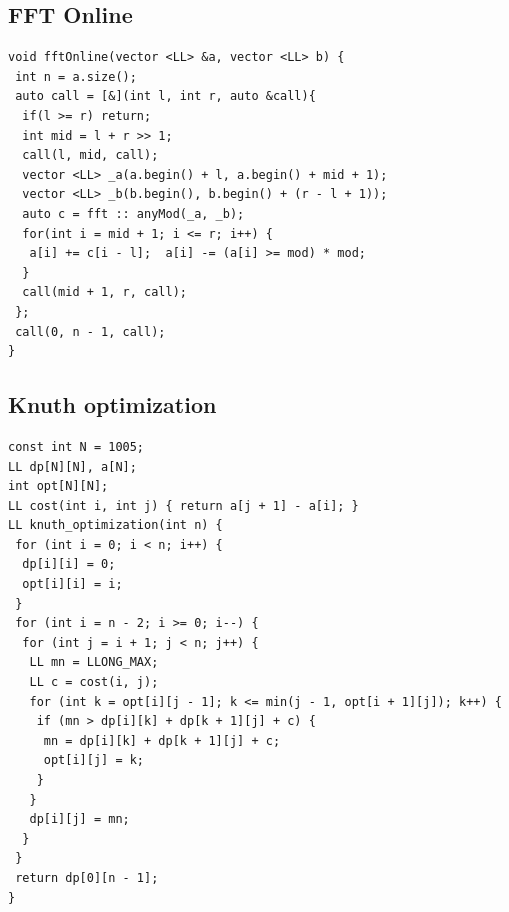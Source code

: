 \documentclass[a4paper,11pt,oneside]{article}
\begin{document}
\begin{multicols*}{\COLS}

\subsection{FFT Online}
\begin{lstlisting}
void fftOnline(vector <LL> &a, vector <LL> b) {
 int n = a.size();
 auto call = [&](int l, int r, auto &call){
  if(l >= r) return;
  int mid = l + r >> 1;
  call(l, mid, call);
  vector <LL> _a(a.begin() + l, a.begin() + mid + 1);
  vector <LL> _b(b.begin(), b.begin() + (r - l + 1));
  auto c = fft :: anyMod(_a, _b);
  for(int i = mid + 1; i <= r; i++) {
   a[i] += c[i - l];  a[i] -= (a[i] >= mod) * mod;
  }
  call(mid + 1, r, call);
 };
 call(0, n - 1, call);
}
\end{lstlisting}
\subsection{Knuth optimization}
\begin{lstlisting}
const int N = 1005;
LL dp[N][N], a[N];
int opt[N][N];
LL cost(int i, int j) { return a[j + 1] - a[i]; }
LL knuth_optimization(int n) {
 for (int i = 0; i < n; i++) {
  dp[i][i] = 0;
  opt[i][i] = i;
 }
 for (int i = n - 2; i >= 0; i--) {
  for (int j = i + 1; j < n; j++) {
   LL mn = LLONG_MAX;
   LL c = cost(i, j);
   for (int k = opt[i][j - 1]; k <= min(j - 1, opt[i + 1][j]); k++) {
    if (mn > dp[i][k] + dp[k + 1][j] + c) {
     mn = dp[i][k] + dp[k + 1][j] + c;
     opt[i][j] = k;
    }
   }
   dp[i][j] = mn;
  }
 }
 return dp[0][n - 1];
}
\end{lstlisting}

\end{multicols*}
\end{document}
